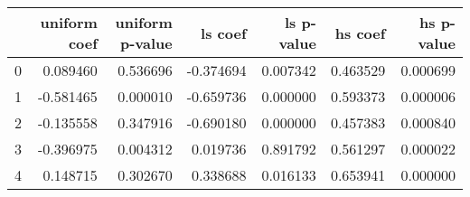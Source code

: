 \begin{tabular}{lrrrrrr}
\toprule
 & uniform coef & uniform p-value & ls coef & ls p-value & hs coef & hs p-value \\
\midrule
0 & 0.089460 & 0.536696 & -0.374694 & 0.007342 & 0.463529 & 0.000699 \\
1 & -0.581465 & 0.000010 & -0.659736 & 0.000000 & 0.593373 & 0.000006 \\
2 & -0.135558 & 0.347916 & -0.690180 & 0.000000 & 0.457383 & 0.000840 \\
3 & -0.396975 & 0.004312 & 0.019736 & 0.891792 & 0.561297 & 0.000022 \\
4 & 0.148715 & 0.302670 & 0.338688 & 0.016133 & 0.653941 & 0.000000 \\
\bottomrule
\end{tabular}
